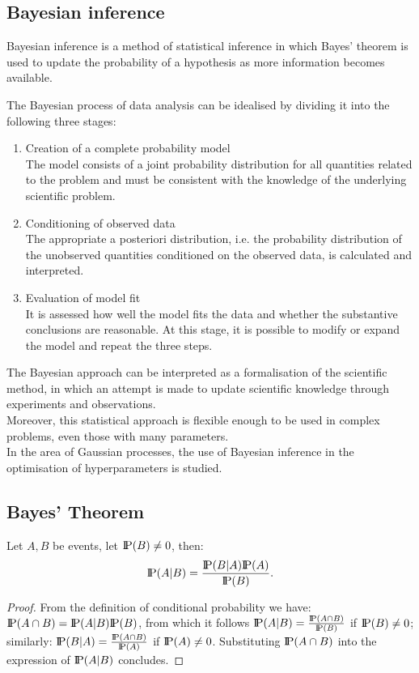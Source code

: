 \subsection{Bayesian inference}
Bayesian inference is a method of statistical inference in which Bayes' theorem is used to update the probability of a hypothesis as more information becomes available. 

The Bayesian process of data analysis can be idealised by dividing it into the following three stages:
\begin{enumerate}
    \item Creation of a complete probability model\\
    The model consists of a joint probability distribution for all quantities related to the problem and must be consistent with the knowledge of the underlying scientific problem.
    \item Conditioning of observed data\\ The appropriate a posteriori distribution, i.e. the probability distribution of the unobserved quantities conditioned on the observed data, is calculated and interpreted.
    \item Evaluation of model fit\\
    It is assessed how well the model fits the data and whether the substantive conclusions are reasonable. At this stage, it is possible to modify or expand the model and repeat the three steps.
\end{enumerate}
The Bayesian approach can be interpreted as a formalisation of the scientific method, in which an attempt is made to update scientific knowledge through experiments and observations.\\
Moreover, this statistical approach is flexible enough to be used in complex problems, even those with many parameters.\\

In the area of Gaussian processes, the use of Bayesian inference in the optimisation of hyperparameters is studied.

\newpage

\subsection{Bayes' Theorem}
\begin{teo}
    Let $A, B$ be events, let $\text{I\kern-0.18em P}(B)\neq 0$, then:
\[
\text{I\kern-0.18em P}(A|B) = \frac{\text{I\kern-0.18em P}(B|A)\text{I\kern-0.18em P}(A)}{\text{I\kern-0.18em P}(B)}.
\]
\end{teo}
\begin{proof}
    From the definition of conditional probability we have: $\text{I\kern-0.18em P}(A\cap B) = \text{I\kern-0.18em P}(A|B)\text{I\kern-0.18em P}(B)$, from which it follows $\text{I\kern-0.18em P}(A|B)=\frac{\text{I\kern-0.18em P}(A\cap B)}{\text{I\kern-0.18em P}(B)}$ if $\text{I\kern-0.18em P}(B)\neq 0$; similarly: $\text{I\kern-0.18em P}(B|A)=\frac{\text{I\kern-0.18em P}(A\cap B)}{\text{I\kern-0.18em P}(A)}$ if $\text{I\kern-0.18em P}(A)\neq 0$. Substituting $\text{I\kern-0.18em P}(A\cap B)$ into the expression of $\text{I\kern-0.18em P}(A|B)$ concludes.
\end{proof}

